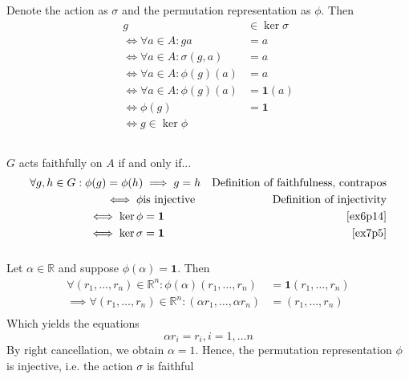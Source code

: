 \documentclass{article}
\newcommand{\reals}{\mathbb{R}}
\newcommand{\id}{ \bm{1} }
\begin{document}
\subsubsection{}\label{ex7p5}
Denote the action as $\sigma$ and the permutation representation as $\phi$. Then
\begin{align*}
g &\in \ker\sigma\\
\iff \forall a\in A: ga&=a\\
\iff \forall a\in A: \sigma(g,a)&=a\\
\iff \forall a\in A: \phi(g)(a)&=a\\
\iff \forall a\in A: \phi(g)(a)&=\id(a)\\
\iff \phi(g)&=\id\\
\iff g \in \ker\phi\\
\end{align*}
\subsubsection{}\label{ex7p6}
$G$ acts faithfully on $A$ if and only if...
\begin{align*}
\forall g,h\in G: \phi(g) = \phi(h) &\implies g=h & \mbox{Definition of faithfulness, contrapos}\\
\iff \phi & \mbox{is injective} & \mbox{Definition of injectivity}\\
\iff \ker\phi &= \id & \mbox{\ref{ex6p14}}\\
\iff \ker\sigma &= \id & \mbox{\ref{ex7p5}}\\
\end{align*}
\subsubsection{}\label{ex7p7}
Let $\alpha\in\reals$ and suppose $\phi(\alpha) = \id$. Then
\begin{align*}
\forall(r_1,\ldots,r_n)\in\reals^n: \phi(\alpha)(r_1,\ldots,r_n) &= \id(r_1,\ldots,r_n)\\
\implies \forall(r_1,\ldots,r_n)\in\reals^n: (\alpha r_1,\ldots,\alpha r_n) &= (r_1,\ldots,r_n)\\
\end{align*}
Which yields the equations 
\begin{equation}
\alpha r_i = r_i, i=1,\ldots n
\end{equation}
By right cancellation, we obtain $\alpha = 1$. Hence, the permutation representation $\phi$ is injective, i.e. the action $\sigma$ is faithful
\end{document}
